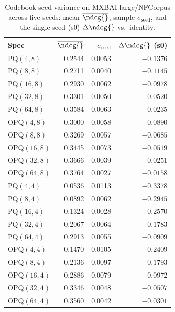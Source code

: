 \begin{table}[t]
\centering
\small
\caption{Codebook seed variance on MXBAI-large/NFCorpus across five seeds: mean $\overline{\ndcg{}}$, sample $\sigma_{\text{seed}}$, and the single-seed (s0) $\Delta\ndcg{}$ vs.\ identity.}
\label{tab:seed-variance-mxbai-large-nfcorpus}
\begin{tabular}{lrrr}
\toprule
Spec & $\overline{\ndcg{}}$ & $\sigma_{\text{seed}}$ & $\Delta\ndcg{}$ (s0) \\
\midrule
PQ$(4,8)$ & 0.2544 & 0.0053 & $-0.1376$ \\
PQ$(8,8)$ & 0.2711 & 0.0040 & $-0.1145$ \\
PQ$(16,8)$ & 0.2930 & 0.0062 & $-0.0978$ \\
PQ$(32,8)$ & 0.3301 & 0.0050 & $-0.0520$ \\
PQ$(64,8)$ & 0.3584 & 0.0063 & $-0.0235$ \\
OPQ$(4,8)$ & 0.3000 & 0.0058 & $-0.0890$ \\
OPQ$(8,8)$ & 0.3269 & 0.0057 & $-0.0685$ \\
OPQ$(16,8)$ & 0.3445 & 0.0073 & $-0.0519$ \\
OPQ$(32,8)$ & 0.3666 & 0.0039 & $-0.0251$ \\
OPQ$(64,8)$ & 0.3764 & 0.0027 & $-0.0158$ \\
PQ$(4,4)$ & 0.0536 & 0.0113 & $-0.3378$ \\
PQ$(8,4)$ & 0.0892 & 0.0062 & $-0.2945$ \\
PQ$(16,4)$ & 0.1324 & 0.0028 & $-0.2570$ \\
PQ$(32,4)$ & 0.2067 & 0.0064 & $-0.1783$ \\
PQ$(64,4)$ & 0.2913 & 0.0055 & $-0.0909$ \\
OPQ$(4,4)$ & 0.1470 & 0.0105 & $-0.2409$ \\
OPQ$(8,4)$ & 0.2136 & 0.0097 & $-0.1793$ \\
OPQ$(16,4)$ & 0.2886 & 0.0079 & $-0.0972$ \\
OPQ$(32,4)$ & 0.3346 & 0.0048 & $-0.0507$ \\
OPQ$(64,4)$ & 0.3560 & 0.0042 & $-0.0301$ \\
\bottomrule
\end{tabular}
\end{table}


